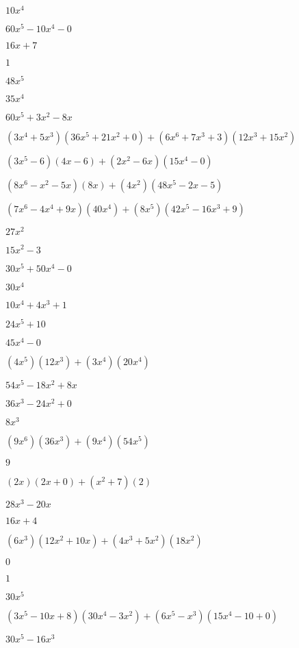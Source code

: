 \documentclass{article}
\begin{document}
\begin{multicols}{2}
$10x^{4}$\item $60x^{5}-10x^{4}-0$\item $16x+7$\item $1$\item $48x^{5}$\item $35x^{4}$\item $60x^{5}+3x^{2}-8x$\item $(3x^{4}+5x^{3})(36x^{5}+21x^{2}+0)+(6x^{6}+7x^{3}+3)(12x^{3}+15x^{2})$\item $(3x^{5}-6)(4x-6)+(2x^2-6x)(15x^{4}-0)$\item $(8x^{6}-x^2-5x)(8x)+(4x^2)(48x^{5}-2x-5)$\item $(7x^{6}-4x^{4}+9x)(40x^{4})+(8x^{5})(42x^{5}-16x^{3}+9)$\item $27x^{2}$\item $15x^{2}-3$\item $30x^{5}+50x^{4}-0$\item $30x^{4}$\item $10x^{4}+4x^{3}+1$\item $24x^{5}+10$\item $45x^{4}-0$\item $(4x^{5})(12x^{3})+(3x^{4})(20x^{4})$\item $54x^{5}-18x^{2}+8x$\item $36x^{3}-24x^{2}+0$\item $8x^{3}$\item $(9x^{6})(36x^{3})+(9x^{4})(54x^{5})$\item $9$\item $(2x)(2x+0)+(x^2+7)(2)$\item $28x^{3}-20x$\item $16x+4$\item $(6x^{3})(12x^{2}+10x)+(4x^{3}+5x^2)(18x^{2})$\item $0$\item $1$\item $30x^{5}$\item $(3x^{5}-10x+8)(30x^{4}-3x^{2})+(6x^{5}-x^{3})(15x^{4}-10+0)$\item $30x^{5}-16x^{3}$\item 
\end{multicols}
\end{document}
